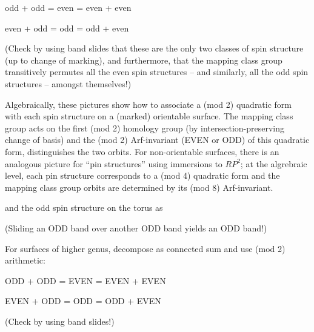 \smallskip

\centerline{odd + odd = even = even + even}

\centerline{even + odd = odd = odd + even}

\smallskip

\noindent
(Check by using band slides that these 
are the only two classes of
spin structure (up to change of marking), 
and furthermore, that the
mapping class group transitively permutes all the even spin
structures -- and similarly, 
all the odd spin structures -- amongst
themselves!)

\smallskip

\noindent
Algebraically, these pictures show how to associate a (mod 2)
quadratic form with each spin structure on a (marked) orientable
surface.  The mapping class group acts on the first (mod 2)
homology group (by intersection-preserving change of basis)
and the (mod 2) Arf-invariant (EVEN or ODD) of this
quadratic form, distinguishes the two
orbits.  For non-orientable surfaces, 
there is an analogous picture
for ``pin structures'' using immersions to $RP^2$; at the
algrebraic level, each pin structure corresponds to a (mod 4)
quadratic form and the mapping class 
group orbits are determined by
its (mod 8) Arf-invariant.






\noindent
and the odd spin structure on the torus as

\centerline{}

\noindent
(Sliding an ODD band over another ODD band yields an ODD band!)

For surfaces of higher genus, 
decompose as connected sum and use (mod 2) arithmetic:

\centerline{ODD + ODD = EVEN = EVEN + EVEN}

\centerline{EVEN + ODD = ODD = ODD + EVEN}

\noindent
(Check by using band slides!)







